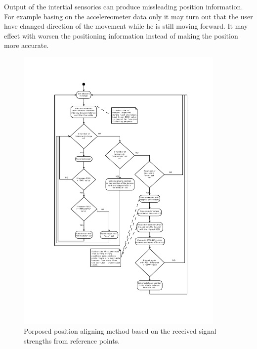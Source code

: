 \documentclass[../main.tex]{subfiles}
\begin{document}
Output of the intertial sensorics can produce missleading position information. For example basing on the accelereometer data only it may turn out that the user have changed direction of the movement while he is still moving forward. It may effect with worsen the positioning information instead of making the position more accurate.

\begin{figure}[!htbp]
\includegraphics[width=0.9\textwidth, trim={2cm 2cm 2cm 2cm},clip]{pictures/architecture_beacons_processing.pdf}
\centering
\caption{Porposed position aligning method based on the received signal strengths from reference points.}
\label{fig:architecture_beacons_processing}
\end{figure}
\end{document}
